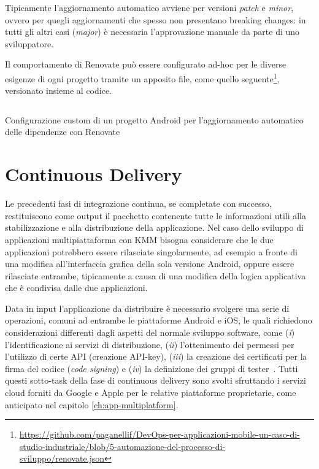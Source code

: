 Tipicamente l'aggiornamento automatico avviene per versioni \textit{patch} e \textit{minor}, ovvero per quegli aggiornamenti che spesso non presentano breaking changes: in tutti gli altri casi (\textit{major}) è necessaria l'approvazione manuale da parte di uno sviluppatore.

Il comportamento di Renovate può essere configurato ad-hoc per le diverse esigenze di ogni progetto tramite un apposito file, come quello seguente\footnote{\href{https://github.com/paganellif/DevOps-per-applicazioni-mobile-un-caso-di-studio-industriale/blob/5-automazione-del-processo-di-sviluppo/renovate.json}{https://github.com/paganellif/DevOps-per-applicazioni-mobile-un-caso-di-studio-industriale/blob/5-automazione-del-processo-di-sviluppo/renovate.json}}, versionato insieme al codice.

\begin{listing}[H]
    \inputminted{json}{code/renovate.json}
    \caption{Configurazione custom di un progetto Android per l'aggiornamento automatico delle dipendenze con Renovate}
\end{listing}

\section{Continuous Delivery}
Le precedenti fasi di integrazione continua, se completate con successo, restituiscono come output il pacchetto contenente tutte le informazioni utili alla stabilizzazione e alla distribuzione della applicazione. Nel caso dello sviluppo di applicazioni multipiattaforma con KMM bisogna considerare che le due applicazioni potrebbero essere rilasciate singolarmente, ad esempio a fronte di una modifica all'interfaccia grafica della sola versione Android, oppure essere rilasciate entrambe, tipicamente a causa di una modifica della logica applicativa che è condivisa dalle due applicazioni.

Data in input l'applicazione da distribuire è necessario svolgere una serie di operazioni, comuni ad entrambe le piattaforme Android e iOS, le quali richiedono considerazioni differenti dagli aspetti del normale sviluppo software, come (\textit{i}) l'identificazione ai servizi di distribuzione, (\textit{ii}) l'ottenimento dei permessi per l'utilizzo di certe API (creazione API-key), (\textit{iii}) la creazione dei certificati per la firma del codice (\textit{code signing}) e (\textit{iv}) la definizione dei gruppi di tester~\cite{mednieks2011programming}. Tutti questi sotto-task della fase di continuous delivery sono svolti sfruttando i servizi cloud forniti da Google e Apple per le relative piattaforme proprietarie, come anticipato nel capitolo \ref{ch:app-multiplatform}.


